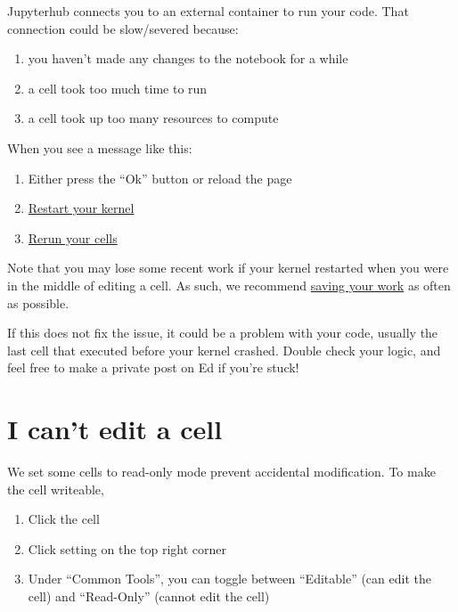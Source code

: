 \documentclass[
  letterpaper,
  DIV=11,
  numbers=noendperiod]{scrreprt}
\providecommand{\tightlist}{%
  \setlength{\itemsep}{0pt}\setlength{\parskip}{0pt}}\usepackage{longtable,booktabs,array}
\begin{document}
Jupyterhub connects you to an external container to run your code. That
connection could be slow/severed because:

\begin{enumerate}
\def\labelenumi{\arabic{enumi}.}
\tightlist
\item
  you haven't made any changes to the notebook for a while
\item
  a cell took too much time to run
\item
  a cell took up too many resources to compute
\end{enumerate}

When you see a message like this:

\begin{enumerate}
\def\labelenumi{\arabic{enumi}.}
\tightlist
\item
  Either press the ``Ok'' button or reload the page
\item
  \href{https://ds100.org/debugging-guide/jupyter101/jupyter101.html\#restarting-kernel}{Restart
  your kernel}
\item
  \href{https://ds100.org/debugging-guide/jupyter101/jupyter101.html\#running-cells}{Rerun
  your cells}
\end{enumerate}

Note that you may lose some recent work if your kernel restarted when
you were in the middle of editing a cell. As such, we recommend
\href{https://ds100.org/debugging-guide/jupyter101/jupyter101.html\#saving-your-notebook}{saving
your work} as often as possible.

If this does not fix the issue, it could be a problem with your code,
usually the last cell that executed before your kernel crashed. Double
check your logic, and feel free to make a private post on Ed if you're
stuck!

\section{I can't edit a cell}\label{i-cant-edit-a-cell}

We set some cells to read-only mode prevent accidental modification. To
make the cell writeable,

\begin{enumerate}
\def\labelenumi{\arabic{enumi}.}
\tightlist
\item
  Click the cell
\item
  Click setting on the top right corner
\item
  Under ``Common Tools'', you can toggle between ``Editable'' (can edit
  the cell) and ``Read-Only'' (cannot edit the cell)
\end{enumerate}
\end{document}
